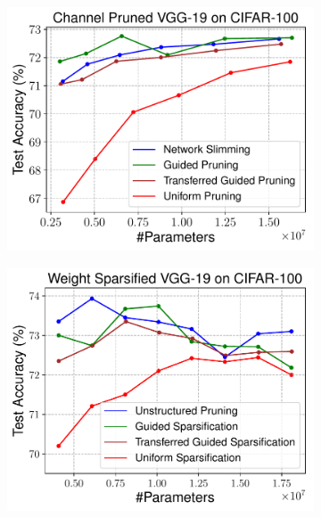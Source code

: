 \begin{figure}[!ht]
\centering
\begin{minipage}{.47\textwidth}
 \begin{subfigure}{\textwidth}
 \centering
 \includegraphics[width=\textwidth]{figures/cifar100-vgg19-slimming.pdf}
 \end{subfigure}
\end{minipage}
\begin{minipage}{.47\textwidth}
 \begin{subfigure}{\textwidth}
 \centering
\includegraphics[width=\textwidth]{figures/cifar100-vgg19-transfer.pdf}

\end{subfigure}
\end{minipage}
\end{figure}
